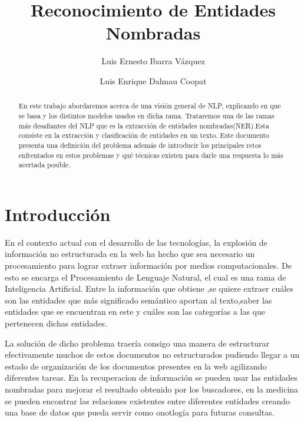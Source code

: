 \documentclass[runningheads]{llncs}
\begin{document}
%
\title{Reconocimiento de Entidades Nombradas}
%
%
\author{Luis Ernesto Ibarra Vázquez \and
Luis Enrique Dalmau Coopat}
%
%
%
\maketitle              %
%
\begin{abstract}

En este trabajo abordaremos acerca de una visión general de NLP, explicando en que se basa y los distintos modelos usados en dicha rama. Trataremos una de las ramas más desafiantes del NLP que es la extracción de entidades nombradas(NER).Esta consiste en la extracción y clasificación de entidades en un texto. Este documento presenta una definición del problema además de introducir los principales retos enfrentados en estos problemas y qué técnicas existen para darle una respuesta lo más acertada posible. 

\end{abstract}
%
%
%
\section{Introducción}

En el contexto actual con el desarrollo de las tecnologías, la explosión de información no estructurada en la web ha hecho que sea necesario un procesamiento para lograr extraer información por medios computacionales. De esto se encarga el Procesamiento de Lenguaje Natural, el cual es una rama de Inteligencia Artificial. Entre la información que obtiene ,se quiere extraer cuáles son las entidades que más significado semántico aportan al texto,saber las entidades que se encuentran en este y cuáles son las categorías a las que pertenecen dichas entidades.

La solución de dicho problema traería consigo una manera de estructurar efectivamente muchos de estos documentos no estructurados pudiendo llegar a un estado de organización de los documentos presentes en la web agilizando diferentes tareas. En la recuperacion de información se pueden usar las entidades nombradas para mejorar el resultado obtenido por los buscadores, en la medicina se pueden encontrar las relaciones existentes entre diferentes entidades creando una base de datos que pueda servir como onotlogía para futuras consultas.
\end{document}
